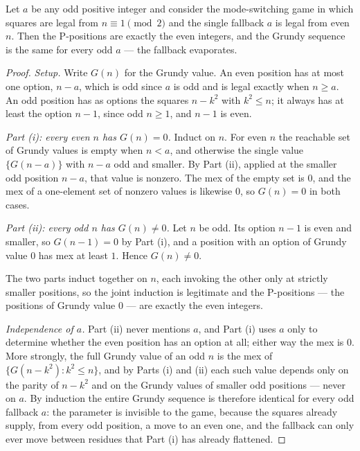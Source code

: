 \begin{proposition}\label{prop:collapse}
Let $a$ be any odd positive integer and consider the mode-switching game
in which squares are legal from $n \equiv 1 \pmod 2$ and the single
fallback $a$ is legal from even $n$. Then the P-positions are exactly the
even integers, and the Grundy sequence is the same for every odd $a$ ---
the fallback evaporates.
\end{proposition}
\begin{proof}
\emph{Setup.} Write $G(n)$ for the Grundy value. An even position has at
most one option, $n - a$, which is odd since $a$ is odd and is legal
exactly when $n \ge a$. An odd position has as options the squares
$n - k^2$ with $k^2 \le n$; it always has at least the option $n - 1$,
since odd $n \ge 1$, and $n - 1$ is even.

\emph{Part (i): every even $n$ has $G(n) = 0$.} Induct on $n$. For even
$n$ the reachable set of Grundy values is empty when $n < a$, and
otherwise the single value $\{G(n - a)\}$ with $n - a$ odd and smaller.
By Part (ii), applied at the smaller odd position $n - a$, that value is
nonzero. The mex of the empty set is $0$, and the mex of a one-element
set of nonzero values is likewise $0$, so $G(n) = 0$ in both cases.

\emph{Part (ii): every odd $n$ has $G(n) \ne 0$.} Let $n$ be odd. Its
option $n - 1$ is even and smaller, so $G(n - 1) = 0$ by Part (i), and a
position with an option of Grundy value $0$ has mex at least $1$. Hence
$G(n) \ne 0$.

The two parts induct together on $n$, each invoking the other only at
strictly smaller positions, so the joint induction is legitimate and the
P-positions --- the positions of Grundy value $0$ --- are exactly the
even integers.

\emph{Independence of $a$.} Part (ii) never mentions $a$, and Part (i)
uses $a$ only to determine whether the even position has an option at
all; either way the mex is $0$. More strongly, the full Grundy value of
an odd $n$ is the mex of $\{G(n - k^2) : k^2 \le n\}$, and by Parts (i)
and (ii) each such value depends only on the parity of $n - k^2$ and on
the Grundy values of smaller odd positions --- never on $a$. By induction
the entire Grundy sequence is therefore identical for every odd fallback
$a$: the parameter is invisible to the game, because the squares already
supply, from every odd position, a move to an even one, and the fallback
can only ever move between residues that Part (i) has already flattened.
\end{proof}

